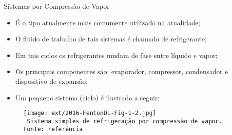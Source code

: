     \begin{frame}{Sistemas por Compressão de Vapor}\vspace*{-0em}
        \begin{itemize}
            \item<1-> É o tipo atualmente \alert{mais comumente utilizado} na atualidade;
                \\[\medskipamount]
            \item<2-> O \alert{fluido de trabalho} de tais sistemas é chamado de
                \alert{refrigerante};
                \\[\medskipamount]
            \item<3-> Em tais ciclos os refrigerantes \alert{mudam de fase} entre
                \alert{líquido} e \alert{vapor};
                \\[\medskipamount]
            \item<4-> Os principais componentes são: \alert{evaporador}, \alert{compressor},
                \alert{condensador} e \alert{dispositivo de expansão};
                \\[\medskipamount]
            \item<5-> Um pequeno sistema (\alert{ciclo}) é ilustrado a seguir:
        \end{itemize}
    \end{frame}
    \begin{frame}\vspace*{-0em}
        \begin{center}
            \begin{figure}
                \fontsize{5.0}{5}\selectfont
                \texttt{[image: ext/2016-FentonDL-Fig-1-2.jpg]}
                \\\vspace*{-0.0em}\texttt{%
                    Sistema simples de refrigeração por compressão de vapor.\\
                    Fonte: referência~\cite{2016-FentonDL-ASHRAE}
                }
            \end{figure}
        \end{center}
    \end{frame}

